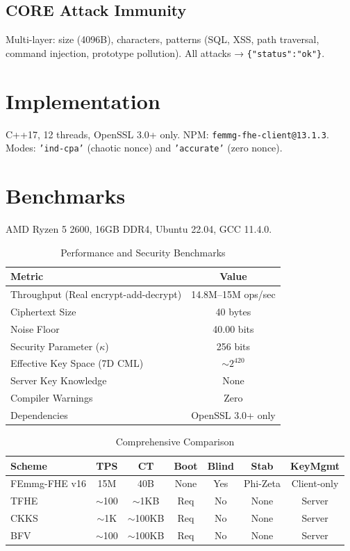 \documentclass{article}
\begin{document}
\subsection{CORE Attack Immunity}
Multi-layer: size (4096B), characters, patterns (SQL, XSS, path traversal, command injection, prototype pollution). All attacks → \texttt{\{"status":"ok"\}}.

\section{Implementation}
C++17, 12 threads, OpenSSL 3.0+ only. NPM: \texttt{femmg-fhe-client@13.1.3}. Modes: \texttt{'ind-cpa'} (chaotic nonce) and \texttt{'accurate'} (zero nonce).

\section{Benchmarks}
AMD Ryzen 5 2600, 16GB DDR4, Ubuntu 22.04, GCC 11.4.0.

\begin{table}[H]
\centering
\begin{tabular}{|l|c|}
\hline
\textbf{Metric} & \textbf{Value} \\
\hline
Throughput (Real encrypt-add-decrypt) & 14.8M--15M ops/sec \\
Ciphertext Size & 40 bytes \\
Noise Floor & 40.00 bits \\
Security Parameter ($\kappa$) & 256 bits \\
Effective Key Space (7D CML) & $\sim 2^{420}$ \\
Server Key Knowledge & None \\
Compiler Warnings & Zero \\
Dependencies & OpenSSL 3.0+ only \\
\hline
\end{tabular}
\caption{Performance and Security Benchmarks}
\end{table}

\begin{table}[H]
\centering
\begin{tabular}{|l|c|c|c|c|c|c|}
\hline
\textbf{Scheme} & \textbf{TPS} & \textbf{CT} & \textbf{Boot} & \textbf{Blind} & \textbf{Stab} & \textbf{KeyMgmt} \\
\hline
FEmmg-FHE v16 & 15M & 40B & None & Yes & Phi-Zeta & Client-only \\
TFHE & $\sim$100 & $\sim$1KB & Req & No & None & Server \\
CKKS & $\sim$1K & $\sim$100KB & Req & No & None & Server \\
BFV & $\sim$100 & $\sim$100KB & Req & No & None & Server \\
\hline
\end{tabular}
\caption{Comprehensive Comparison}
\end{table}
\end{document}

